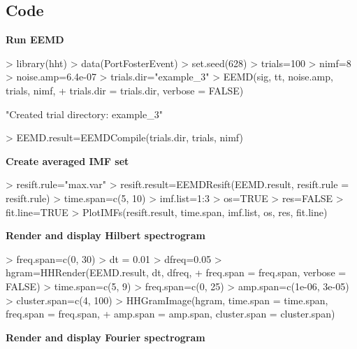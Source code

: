 \documentclass[12pt]{article}
\begin{document}
\subsection{Code}

\textbf{Run EEMD}

\begin{Schunk}
\begin{Sinput}
> library(hht)
> data(PortFosterEvent)
> set.seed(628)
> trials=100
> nimf=8
> noise.amp=6.4e-07
> trials.dir="example_3"
> EEMD(sig, tt, noise.amp, trials, nimf, 
+     trials.dir = trials.dir, verbose = FALSE)
\end{Sinput}
\begin{Soutput}
[1] "Created trial directory: example_3"
\end{Soutput}
\begin{Sinput}
> EEMD.result=EEMDCompile(trials.dir, trials, nimf)
\end{Sinput}
\end{Schunk}

\textbf{Create averaged IMF set}

\begin{Schunk}
\begin{Sinput}
> resift.rule="max.var"
> resift.result=EEMDResift(EEMD.result, resift.rule = resift.rule)
> time.span=c(5, 10)
> imf.list=1:3
> os=TRUE
> res=FALSE
> fit.line=TRUE
> PlotIMFs(resift.result, time.span, imf.list, os, res, fit.line)
\end{Sinput}
\end{Schunk}

\textbf{Render and display Hilbert spectrogram}
\begin{Schunk}
\begin{Sinput}
> freq.span=c(0, 30)
> dt = 0.01
> dfreq=0.05
> hgram=HHRender(EEMD.result, dt, dfreq, 
+     freq.span = freq.span, verbose = FALSE)
> time.span=c(5, 9)
> freq.span=c(0, 25)
> amp.span=c(1e-06, 3e-05)
> cluster.span=c(4, 100)
> HHGramImage(hgram, time.span = time.span, freq.span = freq.span,
+     amp.span = amp.span, cluster.span = cluster.span)
\end{Sinput}
\end{Schunk}

\textbf{Render and display Fourier spectrogram}

\begin{Schunk}
\end{Schunk}
\end{document}
